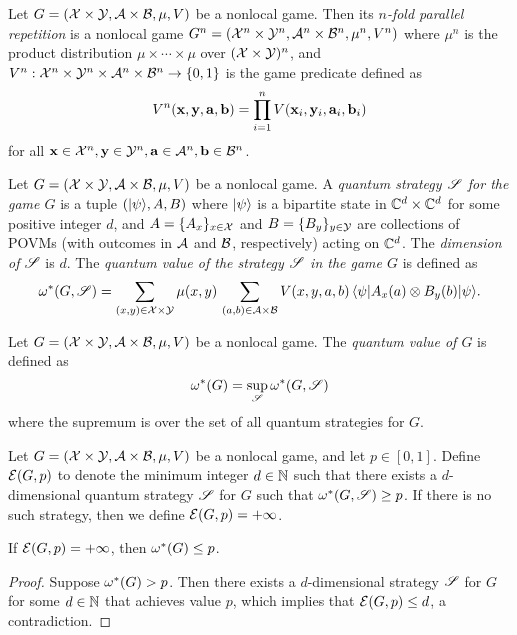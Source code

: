 \begin{definition}
Let $G = (\mathcal{X} \times \mathcal{Y},\mathcal{A} \times \mathcal{B},\mu,V)$ be a nonlocal game. Then its \emph{$n$-fold parallel repetition} is a nonlocal game $G^n = (\mathcal{X}^n \times \mathcal{Y}^n, \mathcal{A}^n \times \mathcal{B}^n,\mu^n,V^n)$ where $\mu^n$ is the product distribution $\mu \times \cdots \times \mu$ over $(\mathcal{X} \times \mathcal{Y})^n$, and $V^n: \mathcal{X}^n \times \mathcal{Y}^n \times \mathcal{A}^n \times \mathcal{B}^n \to \{0,1\}$ is the game predicate defined as
\[
	V^n(\mathbf{x},\mathbf{y},\mathbf{a},\mathbf{b}) = \prod_{i=1}^n V(\mathbf{x}_i,\mathbf{y}_i,\mathbf{a}_i,\mathbf{b}_i)
\]
for all $\mathbf{x} \in \mathcal{X}^n,\mathbf{y} \in \mathcal{Y}^n,\mathbf{a} \in \mathcal{A}^n,\mathbf{b} \in \mathcal{B}^n$.
\end{definition}

\begin{definition}
Let $G = (\mathcal{X} \times \mathcal{Y},\mathcal{A} \times \mathcal{B},\mu,V)$ be a nonlocal game. A \emph{quantum strategy $\mathscr{S}$ for the game $G$} is a tuple $({|\psi\rangle}, A,B)$ where ${|\psi\rangle}$ is a bipartite state in $\mathbb{C}^d \times \mathbb{C}^d$ for some positive integer $d$, and $A = \{ A_x \}_{x \in \mathcal{X}}$ and $B = \{B_y\}_{y \in \mathcal{Y}}$ are collections of POVMs (with outcomes in $\mathcal{A}$ and $\mathcal{B}$, respectively) acting on $\mathbb{C}^d$. The \emph{dimension of $\mathscr{S}$} is $d$. The \emph{quantum value of the strategy $\mathscr{S}$ in the game $G$} is defined as
\[
	\omega^*(G,\mathscr{S}) = \sum_{(x,y) \in \mathcal{X} \times \mathcal{Y}} \mu(x,y) \,  \sum_{(a,b) \in \mathcal{A} \times \mathcal{B}} V(x,y,a,b) \, {\langle\psi|} A_x(a) \otimes B_y(b) {|\psi\rangle}.
\]
\end{definition}

\begin{definition}
Let $G = (\mathcal{X} \times \mathcal{Y},\mathcal{A} \times \mathcal{B},\mu,V)$ be a nonlocal game. The \emph{quantum value of $G$} is defined as
\[
	\omega^*(G) = \sup_{\mathscr{S}} \omega^*(G,\mathscr{S})
\]
where the supremum is over the set of all quantum strategies for $G$.
\end{definition}

\begin{definition}
Let $G = (\mathcal{X} \times \mathcal{Y},\mathcal{A} \times \mathcal{B},\mu,V)$ be a nonlocal game, and let $p \in [0,1]$. Define $\mathcal{E}(G,p)$ to denote the minimum integer $d \in \mathbb{N}$ such that there exists a $d$-dimensional quantum strategy $\mathscr{S}$ for $G$ such that $\omega^*(G,\mathscr{S}) \geq p$. If there is no such strategy, then we define $\mathcal{E}(G,p) = +\infty$.
\end{definition}

\begin{proposition}
\label{prop:entanglement-lb-to-value}
If $\mathcal{E}(G,p) = +\infty$, then $\omega^*(G) \leq p$.
\end{proposition}
\begin{proof}
Suppose $\omega^*(G) > p$. Then there exists a $d$-dimensional strategy $\mathscr{S}$ for $G$ for some $d \in \mathbb{N}$ that achieves value $p$, which implies that $\mathcal{E}(G,p) \leq d$, a contradiction.
\end{proof}

